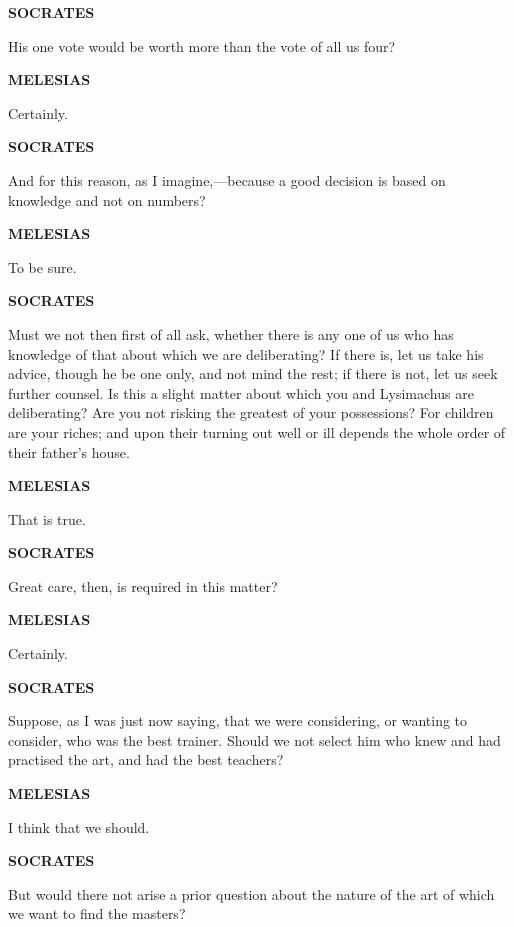 \documentclass[11pt,letter]{article}
\begin{document}
\par \textbf{SOCRATES}
\par   His one vote would be worth more than the vote of all us four?

\par \textbf{MELESIAS}
\par   Certainly.

\par \textbf{SOCRATES}
\par   And for this reason, as I imagine,—because a good decision is based on knowledge and not on numbers?

\par \textbf{MELESIAS}
\par   To be sure.

\par \textbf{SOCRATES}
\par   Must we not then first of all ask, whether there is any one of us who has knowledge of that about which we are deliberating? If there is, let us take his advice, though he be one only, and not mind the rest; if there is not, let us seek further counsel. Is this a slight matter about which you and Lysimachus are deliberating? Are you not risking the greatest of your possessions? For children are your riches; and upon their turning out well or ill depends the whole order of their father's house.

\par \textbf{MELESIAS}
\par   That is true.

\par \textbf{SOCRATES}
\par   Great care, then, is required in this matter?

\par \textbf{MELESIAS}
\par   Certainly.

\par \textbf{SOCRATES}
\par   Suppose, as I was just now saying, that we were considering, or wanting to consider, who was the best trainer. Should we not select him who knew and had practised the art, and had the best teachers?

\par \textbf{MELESIAS}
\par   I think that we should.

\par \textbf{SOCRATES}
\par   But would there not arise a prior question about the nature of the art of which we want to find the masters?
\end{document}
